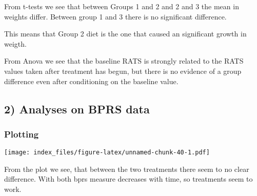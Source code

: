 \documentclass[]{article}
\newenvironment{Shaded}{\begin{snugshade}}{\end{snugshade}}
\newcommand{\KeywordTok}[1]{\textcolor[rgb]{0.13,0.29,0.53}{\textbf{#1}}}
\newcommand{\DataTypeTok}[1]{\textcolor[rgb]{0.13,0.29,0.53}{#1}}
\newcommand{\DecValTok}[1]{\textcolor[rgb]{0.00,0.00,0.81}{#1}}
\newcommand{\StringTok}[1]{\textcolor[rgb]{0.31,0.60,0.02}{#1}}
\newcommand{\CommentTok}[1]{\textcolor[rgb]{0.56,0.35,0.01}{\textit{#1}}}
\newcommand{\OperatorTok}[1]{\textcolor[rgb]{0.81,0.36,0.00}{\textbf{#1}}}
\newcommand{\NormalTok}[1]{#1}
\begin{document}
From t-tests we see that between Groups 1 and 2 and 2 and 3 the mean in
weights differ. Between group 1 and 3 there is no significant
difference.

This means that Group 2 diet is the one that caused an significant
growth in weigth.

From Anova we see that the baseline RATS is strongly related to the RATS
values taken after treatment has begun, but there is no evidence of a
group difference even after conditioning on the baseline value.

\subsection{2) Analyses on BPRS data}\label{analyses-on-bprs-data}

\subsubsection{Plotting}\label{plotting}

\begin{Shaded}
\end{Shaded}

\texttt{[image: index\_files/figure-latex/unnamed-chunk-40-1.pdf]}

From the plot we see, that between the two treatments there seem to no
clear difference. With both bprs measure decreases with time, so
treatments seem to work.
\end{document}

